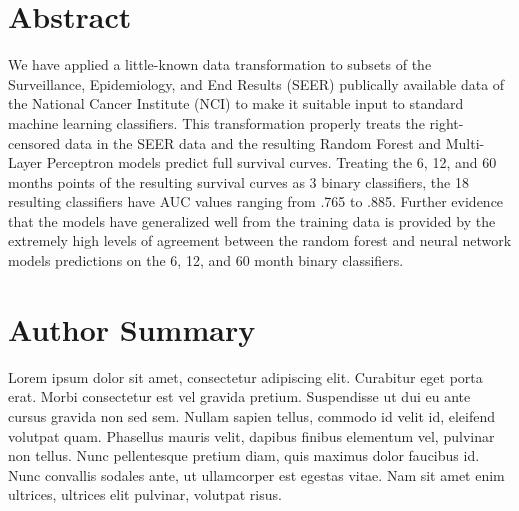 \documentclass[10pt,letterpaper]{article}
\begin{document}
\section*{Abstract}
We have applied a little-known data transformation to subsets of the Surveillance, 
Epidemiology, and End Results (SEER) publically available data of the National Cancer 
Institute (NCI) to make it suitable input to standard machine learning classifiers. This transformation properly treats the right-censored data in the SEER data and the resulting Random Forest and Multi-Layer Perceptron models predict full survival curves. Treating the 6, 12, and 60 months points of the resulting survival curves as 3 binary classifiers, the 18 resulting classifiers have AUC values ranging from  .765 to .885. Further evidence that the models have generalized well from the training data is provided by the extremely high levels of agreement between the random forest and neural network models predictions on the 6, 12, and 60 month binary classifiers.



\section*{Author Summary}
Lorem ipsum dolor sit amet, consectetur adipiscing elit. Curabitur eget porta erat. Morbi consectetur est vel gravida pretium. Suspendisse ut dui eu ante cursus gravida non sed sem. Nullam sapien tellus, commodo id velit id, eleifend volutpat quam. Phasellus mauris velit, dapibus finibus elementum vel, pulvinar non tellus. Nunc pellentesque pretium diam, quis maximus dolor faucibus id. Nunc convallis sodales ante, ut ullamcorper est egestas vitae. Nam sit amet enim ultrices, ultrices elit pulvinar, volutpat risus.

\linenumbers
\end{document}
